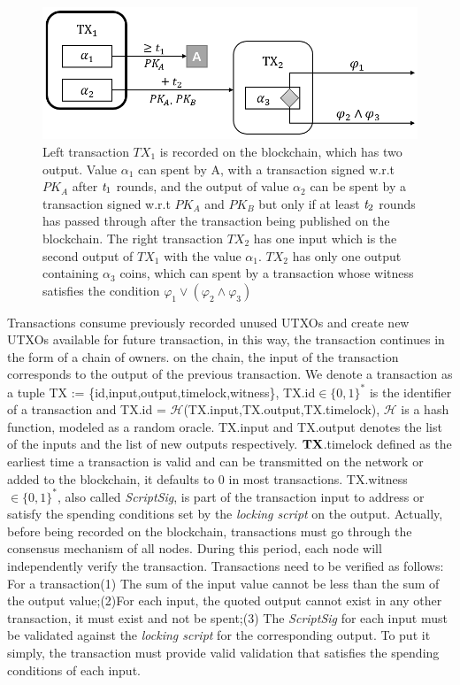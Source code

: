 \documentclass[conference]{IEEEtran}
\begin{document}
\begin{figure}[t]
    \centering
    \includegraphics[scale=0.5]{fig2.png}
    \caption{Left transaction $TX_1$ is recorded on the blockchain, which has two output. Value $\alpha_1$ can spent by A, with a 
    transaction signed w.r.t $PK_A$ after $\emph{t}_1$ rounds, and the output of value $\alpha_2$ can be spent by a transaction signed w.r.t 
    $PK_A$ and $PK_B$ but only if at least $\emph{t}_2$ rounds has passed through after the transaction being published on the blockchain. The
    right transaction $TX_2$ has one input which is the second output of $TX_1$ with the value $\alpha_1$. $TX_2$ has only one
    output containing $\alpha_3$ coins, which can spent by a transaction whose witness satisfies the condition $\varphi_1 \vee (\varphi_2 
    \wedge \varphi_3)$}
\end{figure}

 Transactions consume previously recorded unused UTXOs and create new UTXOs available for future transaction, in this way, the 
 transaction continues in the form of a chain of owners. on the chain, the input of the transaction corresponds to the output 
 of the previous transaction. We denote a transaction as a tuple TX := \{id,input,output,timelock,witness\}, TX.id$\in\{0,1\}^*$
 is the identifier of a transaction and TX.id = $\mathcal H$(TX.input,TX.output,TX.timelock), $\mathcal H$ is a hash function,
 modeled as a random oracle. TX.input and TX.output denotes the list of the inputs and the list of new outputs respectively.
 $\bf TX$.timelock defined as the earliest time a transaction is valid and can be transmitted on the network or added to the blockchain, 
 it defaults to 0 in most transactions. TX.witness$\in\{0,1\}^*$, also called \emph{ScriptSig}, is part of the transaction input to address or satisfy the spending 
 conditions set by the \emph{locking script} on the output. Actually, before being recorded on the blockchain, transactions must go
 through the consensus mechanism of all nodes. During this period, each node will independently verify the transaction. Transactions need to be verified as follows: 
 For a transaction(1) The sum of the input value cannot be less 
 than the sum of the output value;(2)For each input, the quoted output cannot exist in any other transaction, it must exist and not 
 be spent;(3) The \emph{ScriptSig} for each input must be validated against the \emph{locking script} for the corresponding output.
 To put it simply, the transaction must provide valid validation that satisfies the spending conditions of each input.
\end{document}

